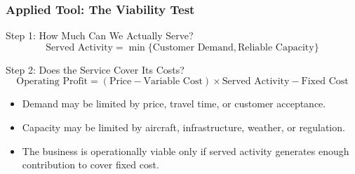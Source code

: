 \documentclass{beamer}
\begin{document}
\begin{frame}[t]
\frametitle{Applied Tool: The Viability Test}

\setlength{\abovedisplayskip}{3pt}
\setlength{\belowdisplayskip}{3pt}

\begin{block}{Step 1: How Much Can We Actually Serve?}
\[
\text{Served Activity} = \min\{ \text{Customer Demand}, \text{Reliable Capacity} \}
\]
\end{block}

\vspace{-0.1cm}

\begin{block}{Step 2: Does the Service Cover Its Costs?}
\[
\text{Operating Profit} = (\text{Price} - \text{Variable Cost}) \times \text{Served Activity} - \text{Fixed Cost}
\]
\end{block}

\vspace{0.15cm}

\begin{itemize}
  \setlength{\itemsep}{2pt}
  \item Demand may be limited by price, travel time, or customer acceptance.
  \item Capacity may be limited by aircraft, infrastructure, weather, or regulation.
  \item The business is operationally viable only if served activity generates enough contribution to cover fixed cost.
\end{itemize}

\end{frame}
\end{document}
